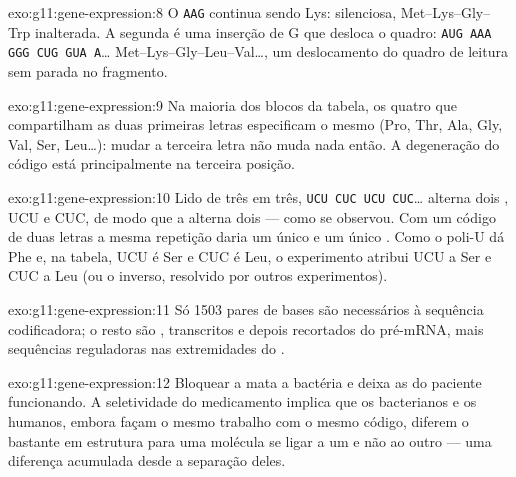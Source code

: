\begin{solution}{exo:g11:gene-expression:8}
O \texttt{AAG} continua sendo Lys: silenciosa, Met--Lys--Gly--Trp
inalterada. A segunda é uma inserção de G que desloca o quadro:
\texttt{AUG AAA GGG
CUG GUA A}\dots{} Met--Lys--Gly--Leu--Val\dots, um deslocamento do
quadro de leitura sem parada no fragmento.
\end{solution}

\begin{solution}{exo:g11:gene-expression:9}
Na maioria dos blocos da tabela, os quatro  que compartilham as
duas primeiras letras especificam o mesmo  (Pro, Thr, Ala,
Gly, Val, Ser, Leu\dots): mudar a terceira letra não muda nada então. A
degeneração do código está principalmente na terceira posição.
\end{solution}

\begin{solution}{exo:g11:gene-expression:10}
Lido de três em três, \texttt{UCU CUC UCU CUC}\dots{} alterna dois
, UCU e CUC, de modo que a  alterna dois  ---
como se observou. Com um código de duas letras a mesma repetição daria
um único  e um único . Como o poli-U dá Phe e, na
tabela, UCU é Ser e CUC é Leu, o experimento atribui UCU a Ser e CUC a
Leu (ou o inverso, resolvido por outros experimentos).
\end{solution}

\begin{solution}{exo:g11:gene-expression:11}
Só 1503 pares de bases são necessários à sequência codificadora; o
resto são , transcritos e depois recortados do pré-mRNA, mais
sequências reguladoras nas extremidades do .
\end{solution}

\begin{solution}{exo:g11:gene-expression:12}
Bloquear a  mata a bactéria e deixa as  do paciente
funcionando. A seletividade do medicamento implica que os 
bacterianos e os humanos, embora façam o mesmo trabalho com o mesmo
código, diferem o bastante em estrutura para uma molécula se ligar a um
e não ao outro --- uma diferença acumulada desde a separação deles.
\end{solution}


